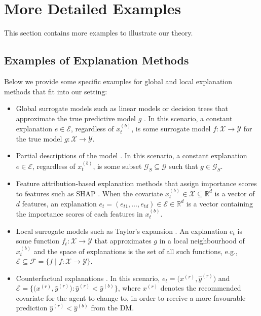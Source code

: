 \section{More Detailed Examples}
This section contains more examples to illustrate our theory.

\subsection{Examples of Explanation Methods}\label{apx:explanation-methods}

Below we provide some specific examples for global and local explanation methods that fit into our setting:

\begin{itemize}
    \item Global surrogate models such as linear models or decision trees that approximate the true predictive model $g$ \citep{molnar2020interpretable}. In this scenario, a constant explanation $e\in\mathcal{E}$, regardless of $x_t^{(b)}$, is some surrogate model $f:\mathcal{X}\to\mathcal{Y}$ for the true model $g:\mathcal{X}\to\mathcal{Y}$.
    
    \item Partial descriptions of the model \citep{cohen2024bayesian}. In this scenario, a constant explanation $e\in\mathcal{E}$, regardless of $x_t^{(b)}$, is some subset $\mathcal{G}_S\subseteq\mathcal{G}$ such that $g\in\mathcal{G}_S$.
    
    \item Feature attribution-based explanation methods that assign importance scores to features such as SHAP \citep{lundberg2017unified}. When the covariate $x_t^{(b)}\in\mathcal{X}\subseteq\mathbb{R}^d$ is a vector of $d$ features, an explanation $e_t=(e_{t1}, \ldots, e_{td})\in\mathcal{E}\in\mathbb{R}^d$ is a vector containing the importance scores of each features in $x_t^{(b)}$.
    
    \item Local surrogate models such as Taylor's expansion \citep{xie2024non}. An explanation $e_t$ is some function $f_t:\mathcal{X}\to\mathcal{Y}$ that approximates $g$ in a local neighbourhood of $x_t^{(b)}$ and the space of explanations is the set of all such functions, e.g., $\mathcal{E}\subseteq\mathcal{F}=\{f\mid f:\mathcal{X}\to\mathcal{Y}\}$.
    
    \item Counterfactual explanations \citep{wachter2017counterfactual}. In this scenario, $e_t=\big(x^{(r)}, \hat{y}^{(r)}\big)$ and $\mathcal{E}=\Big\{\big(x^{(r)}, \hat{y}^{(r)}\big):\hat{y}^{(r)}<\hat{y}^{(b)}\Big\}$, where $x^{(r)}$ denotes the recommended covariate for the agent to change to, in order to receive a more favourable prediction $\hat{y}^{(r)}<\hat{y}^{(b)}$ from the DM.
\end{itemize}


